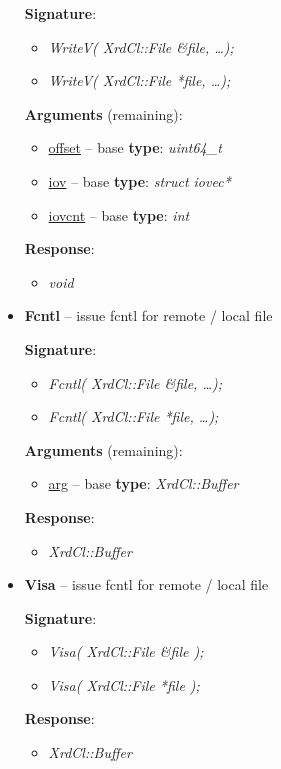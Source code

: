 \documentclass{article}
\begin{document}
\begin{itemize}
				  	\textbf{Signature}:
				  	\begin{itemize} 
			          \item \textit{WriteV( XrdCl::File \&file, \ldots);}
			          \item \textit{WriteV( XrdCl::File *file, \ldots );}
			        \end{itemize}
			        
			        \textbf{Arguments} (remaining):
					\begin{itemize}
					  \item \underline{offset} -- base \textbf{type}: \textit{uint64_t}
					  \item \underline{iov} -- base \textbf{type}: \textit{struct iovec*}
					  \item \underline{iovcnt} -- base \textbf{type}: \textit{int}
				    \end{itemize}
				    
					\textbf{Response}:
					\begin{itemize}
					  \item \textit{void}
					\end{itemize}
					
				  \item \textbf{Fcntl} -- issue fcntl for remote / local file
				  
				  	\textbf{Signature}:
				  	\begin{itemize} 
			          \item \textit{Fcntl( XrdCl::File \&file, \ldots);}
			          \item \textit{Fcntl( XrdCl::File *file, \ldots );}
			        \end{itemize}
			        
			        \textbf{Arguments} (remaining):
					\begin{itemize}
					  \item \underline{arg} -- base \textbf{type}: \textit{XrdCl::Buffer}
				    \end{itemize}
				    
					\textbf{Response}:
					\begin{itemize}
					  \item \textit{XrdCl::Buffer}
					\end{itemize}
					
				  \item \textbf{Visa} -- issue fcntl for remote / local file
				  
				  	\textbf{Signature}:
				  	\begin{itemize} 
			          \item \textit{Visa( XrdCl::File \&file );}
			          \item \textit{Visa( XrdCl::File *file );}
			        \end{itemize}
			        
					\textbf{Response}:
					\begin{itemize}
					  \item \textit{XrdCl::Buffer}
					\end{itemize}
			        
			\end{itemize}
			
\end{document}
